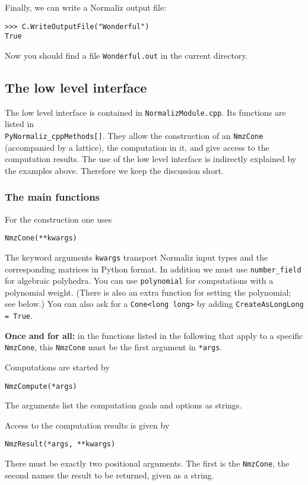 \documentclass[12pt,a4paper]{scrartcl}
\theoremstyle{definition}
\def\ttt{\texttt}
\begin{document}
\begin{small}
Finally, we can write a Normaliz output file:
\begin{Verbatim}
>>> C.WriteOutputFile("Wonderful")
True
\end{Verbatim}
Now you should find a file \verb|Wonderful.out| in the current directory.

\subsection{The low level interface}

The low level interface is contained in \ttt{NormalizModule.cpp}. Its functions are listed in\\ \verb|PyNormaliz_cppMethods[]|. They allow the construction of an \verb|NmzCone| (accompanied by a lattice), the computation in it, and give access to the computation results. The use of the low level interface is indirectly explained by the examples above. Therefore we keep the discussion short.

\subsubsection{The main functions}

For the construction one uses
\begin{Verbatim}
NmzCone(**kwargs)
\end{Verbatim}
The keyword arguments \ttt{kwargs} transport Normaliz input types and the corresponding matrices in Python format. In addition we must use \ttt{number\_field} for algebraic polyhedra. You can use \ttt{polynomial} for computations with a polynomial weight. (There is also an extra function for setting the polynomial; see below.) You can also ask for a \verb|Cone<long long>| by adding \verb|CreateAsLongLong = True|.

\textbf{Once and for all:} in the functions listed in the following that apply to a specific \verb|NmzCone|, this \verb|NmzCone| must be the first argument in \verb|*args|.

Computations are started by
\begin{Verbatim}
NmzCompute(*args)
\end{Verbatim}
The arguments list the computation goals and options as strings.

Access to the computation results is given by
\begin{Verbatim}
NmzResult(*args, **kwargs)
\end{Verbatim}
There must be exactly two positional arguments. The first is the \verb|NmzCone|, the second names the result to be returned, given as a string.


\end{small}
\end{document}
